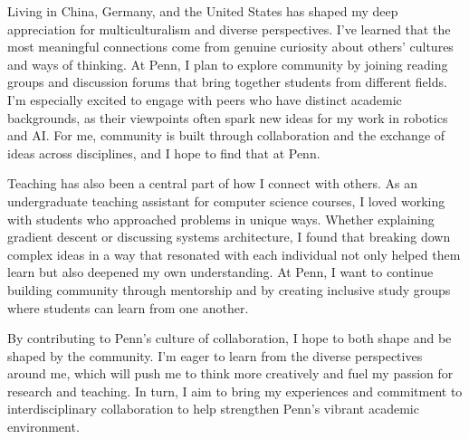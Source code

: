 \documentclass[11pt]{article}
\begin{document}
Living in China, Germany, and the United States has shaped my deep appreciation for multiculturalism and diverse perspectives. I've learned that the most meaningful connections come from genuine curiosity about others' cultures and ways of thinking. At Penn, I plan to explore community by joining reading groups and discussion forums that bring together students from different fields. I'm especially excited to engage with peers who have distinct academic backgrounds, as their viewpoints often spark new ideas for my work in robotics and AI. For me, community is built through collaboration and the exchange of ideas across disciplines, and I hope to find that at Penn.

Teaching has also been a central part of how I connect with others. As an undergraduate teaching assistant for computer science courses, I loved working with students who approached problems in unique ways. Whether explaining gradient descent or discussing systems architecture, I found that breaking down complex ideas in a way that resonated with each individual not only helped them learn but also deepened my own understanding. At Penn, I want to continue building community through mentorship and by creating inclusive study groups where students can learn from one another.

By contributing to Penn's culture of collaboration, I hope to both shape and be shaped by the community. I'm eager to learn from the diverse perspectives around me, which will push me to think more creatively and fuel my passion for research and teaching. In turn, I aim to bring my experiences and commitment to interdisciplinary collaboration to help strengthen Penn's vibrant academic environment.
\end{document}
